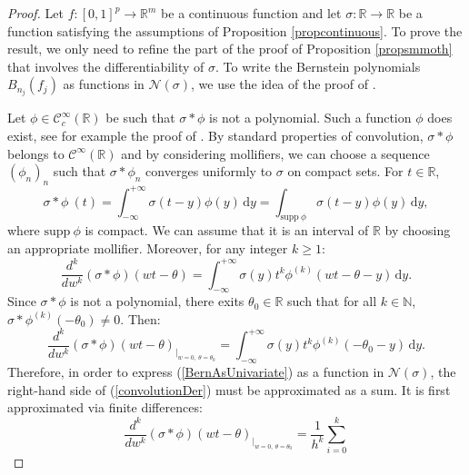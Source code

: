 \documentclass[anon,12pt]{colt2021} %
\begin{document}
\begin{proof}
Let $f:[0,1]^{p} \rightarrow \mathbb{R}^{m}$ be a continuous function and let $\sigma: \mathbb{R} \rightarrow \mathbb{R}$ be a function satisfying the assumptions of Proposition \ref{propcontinuous}. To prove the result, we only need to refine the part of the proof of Proposition \ref{propsmmoth} that involves the differentiability of $\sigma$. To write the Bernstein polynomials $B_{n_{j}}(f_{j})$ as functions in $\mathcal{N}(\sigma)$, we use the idea of the proof of \citep[Theorem 3.1]{PinkusMLP}.

Let $\phi \in \mathcal{C}^{\infty}_{c}(\mathbb{R})$ be such that $\sigma * \phi$ is not a polynomial. Such a function $\phi$ does exist, see for example the proof of \citep[Proposition 3.7]{PinkusMLP}. By standard properties of convolution, $\sigma * \phi$ belongs to $\mathcal{C}^{\infty}(\mathbb{R})$ and by considering mollifiers, we can choose a sequence $(\phi_{n})_{n}$ such that $\sigma * \phi_{n}$ converges uniformly to $\sigma$ on compact sets. For $t \in \mathbb{R}$,
\begin{equation*}
    \sigma * \phi \ (t) = \int_{ - \infty}^{+ \infty} \sigma(t-y) \phi(y) \, \mathrm{d}y 
    = \int_{\text{supp} \ \phi} \sigma(t-y) \phi(y) \, \mathrm{d}y,
\end{equation*}
where $\text{supp} \ \phi$ is compact. We can assume that it is an interval of $\mathbb{R}$ by choosing an appropriate mollifier. Moreover, for any integer $k \geq 1$:
\begin{equation*}
    \frac{d^{k}}{dw^{k}} (\sigma * \phi) (wt - \theta) = \int_{ - \infty}^{+ \infty} \sigma(y) t^{k}  \phi ^{(k)}(wt - \theta - y) \, \mathrm{d}y. 
\end{equation*}
Since $\sigma * \phi$ is not a polynomial, there exits $\theta_{0} \in \mathbb{R}$ such that for all $k \in \mathbb{N}$, $\sigma * \phi^{(k)}(-\theta_{0}) \neq 0$. Then:
\begin{equation} \label{convolutionDer}
    \frac{d^{k}}{dw^{k}} ( \sigma * \phi )(wt - \theta)_{\big|_{ \scriptstyle w=0, \ \theta = \theta_{0}}} = \int_{ - \infty}^{+ \infty} \sigma(y) t^{k} \phi ^{(k)} (- \theta_{0} - y) \, \mathrm{d}y.
\end{equation}
Therefore, in order to express (\ref{BernAsUnivariate}) as a function in $\mathcal{N}(\sigma)$, the right-hand side of (\ref{convolutionDer}) must be approximated as a sum. It is first approximated via finite differences:
\begin{equation*}
    \frac{d^{k}}{dw^{k}} (\sigma * \phi) (wt - \theta)_{\big|_{ \scriptstyle w=0, \ \theta = \theta_{0}}} = \frac{1}{h^{k}} \sum_{i=0}^{k} 

\end{equation*}
\end{proof}
\end{document}
